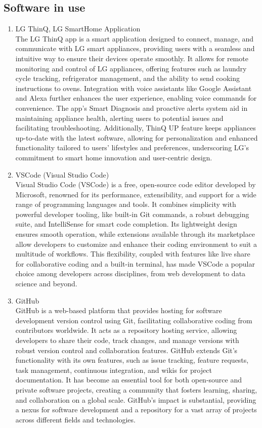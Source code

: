 \documentclass[conference]{IEEEtran}
\begin{document}
\subsection{\large{Software in use}}
\begin{enumerate}[label=\arabic*.]
\item LG ThinQ, LG SmartHome Application\\
The LG ThinQ app is a smart application designed to connect, manage, and communicate with LG smart appliances, providing users with a seamless and intuitive way to ensure their devices operate smoothly. It allows for remote monitoring and control of LG appliances, offering features such as laundry cycle tracking, refrigerator management, and the ability to send cooking instructions to ovens. Integration with voice assistants like Google Assistant and Alexa further enhances the user experience, enabling voice commands for convenience. The app's Smart Diagnosis and proactive alerts system aid in maintaining appliance health, alerting users to potential issues and facilitating troubleshooting. Additionally, ThinQ UP feature keeps appliances up-to-date with the latest software, allowing for personalization and enhanced functionality tailored to users' lifestyles and preferences, underscoring LG's commitment to smart home innovation and user-centric design.\\
\item VSCode (Visual Studio Code)\\
Visual Studio Code (VSCode) is a free, open-source code editor developed by Microsoft, renowned for its performance, extensibility, and support for a wide range of programming languages and tools. It combines simplicity with powerful developer tooling, like built-in Git commands, a robust debugging suite, and IntelliSense for smart code completion. Its lightweight design ensures smooth operation, while extensions available through its marketplace allow developers to customize and enhance their coding environment to suit a multitude of workflows. This flexibility, coupled with features like live share for collaborative coding and a built-in terminal, has made VSCode a popular choice among developers across disciplines, from web development to data science and beyond.\\
\item GitHub\\
GitHub is a web-based platform that provides hosting for software development version control using Git, facilitating collaborative coding from contributors worldwide. It acts as a repository hosting service, allowing developers to share their code, track changes, and manage versions with robust version control and collaboration features. GitHub extends Git's functionality with its own features, such as issue tracking, feature requests, task management, continuous integration, and wikis for project documentation. It has become an essential tool for both open-source and private software projects, creating a community that fosters learning, sharing, and collaboration on a global scale. GitHub's impact is substantial, providing a nexus for software development and a repository for a vast array of projects across different fields and technologies.\\

\end{enumerate}
\end{document}
